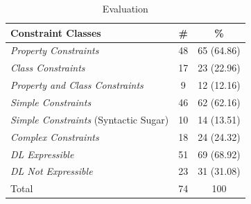 \documentclass{llncs}
\begin{document}
{\begin{table}
  \vspace{0cm}
	\centering
		\begin{tabular}{l|c|c}
      \textbf{Constraint Classes} & \textbf{\#} & \textbf{\%} \\
      \hline
\emph{Property Constraints} & 48 & 65 (64.86) \\
\emph{Class Constraints} & 17 & 23 (22.96) \\
\emph{Property and Class Constraints} & 9 & 12 (12.16) \\
\hline
\emph{Simple Constraints} & 46 & 62 (62.16) \\
\emph{Simple Constraints} (Syntactic Sugar) & 10 & 14 (13.51) \\
\emph{Complex Constraints} & 18 & 24 (24.32) \\
\hline
\emph{DL Expressible} & 51 & 69 (68.92) \\
\emph{DL Not Expressible} & 23 & 31 (31.08) \\
\hline
Total & 74 & 100 \\
		\end{tabular}
	\caption{Evaluation}
	\label{tab:evaluation}
\end{table}

%

}
\end{document}
